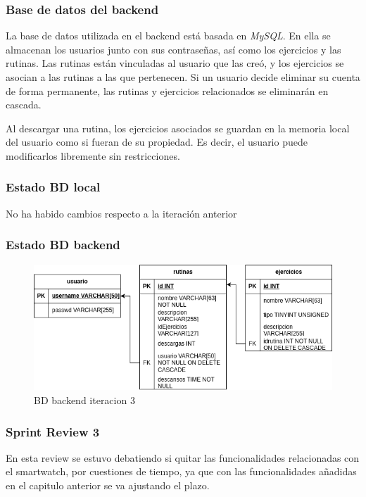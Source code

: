 \subsubsection{Base de datos del backend}
La base de datos utilizada en el backend está basada en \textit{MySQL}. En ella se almacenan los usuarios junto con sus contraseñas, así como los ejercicios y las rutinas. Las rutinas están vinculadas al usuario que las creó, y los ejercicios se asocian a las rutinas a las que pertenecen. Si un usuario decide eliminar su cuenta de forma permanente, las rutinas y ejercicios relacionados se eliminarán en cascada.

Al descargar una rutina, los ejercicios asociados se guardan en la memoria local del usuario como si fueran de su propiedad. Es decir, el usuario puede modificarlos libremente sin restricciones.

\subsubsection{Estado BD local}

No ha habido cambios respecto a la iteración anterior

\subsubsection{Estado BD backend}

\begin{figure}[H]
   \centering
    \includegraphics[width=\textwidth]{fotos/BD be iteracion 3.png}
    \caption{BD backend iteracion 3}
    \label{fig:BD be iteracion 3}
\end{figure}

\subsubsection{Sprint Review 3}

En esta review se estuvo debatiendo si quitar las funcionalidades relacionadas con el smartwatch, por cuestiones de tiempo, ya que con las funcionalidades añadidas en el capitulo anterior se va ajustando el plazo.


